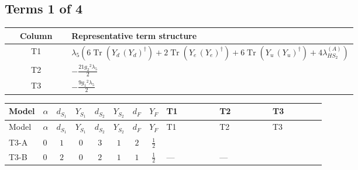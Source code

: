 \documentclass[8pt]{article}
\begin{document}
\begin{landscape}
\subsection*{Terms 1 of 4}
\begin{center}
\begin{tabular}{@{}c >{\raggedright\arraybackslash}p{0.82\linewidth}@{}}
\toprule
Column & Representative term structure \\
\midrule
T1 & \(\displaystyle {\lambda_5} (6 \operatorname{Tr}\!\left({Y_d}\,\left({Y_d}\right)^{\dagger}\right)+2 \operatorname{Tr}\!\left({Y_e}\,\left({Y_e}\right)^{\dagger}\right)+6 \operatorname{Tr}\!\left({Y_u}\,\left({Y_u}\right)^{\dagger}\right)+4 {\lambda_{HS_2}^{(A)}})\) \\
\midrule
T2 & \(\displaystyle -\frac{21 {g_2}^2 {\lambda_5}}{2}\) \\
\midrule
T3 & \(\displaystyle -\frac{9 {g_1}^2 {\lambda_5}}{2}\) \\
\midrule
\bottomrule
\end{tabular}
\end{center}
\smallskip
\tiny
\begin{longtable}{@{}llcccccc >{\raggedright\arraybackslash}p{0.21\linewidth} >{\raggedright\arraybackslash}p{0.21\linewidth} >{\raggedright\arraybackslash}p{0.21\linewidth}@{}}
\toprule
Model & $\alpha$ & $d_{S_1}$ & $Y_{S_1}$ & $d_{S_2}$ & $Y_{S_2}$ & $d_F$ & $Y_F$ & T1 & T2 & T3 \\
\midrule
\endfirsthead
\toprule
Model & $\alpha$ & $d_{S_1}$ & $Y_{S_1}$ & $d_{S_2}$ & $Y_{S_2}$ & $d_F$ & $Y_F$ & T1 & T2 & T3 \\
\midrule
\endhead
T3-A & $0$ & $1$ & $0$ & $3$ & $1$ & $2$ & $\frac{1}{2}$ & \scriptsize\adjustbox{max width=\linewidth}{$\begin{gathered} {\lambda_5} (6 \operatorname{Tr}\!\left({Y_d}\,\left({Y_d}\right)^{\dagger}\right)+2 \operatorname{Tr}\!\left({Y_e}\,\left({Y_e}\right)^{\dagger}\right)+6 \operatorname{Tr}\!\left({Y_u}\,\left({Y_u}\right)^{\dagger}\right)+4 {\lambda_{HS_2}^{(A)}})\end{gathered}$} & \scriptsize\adjustbox{max width=\linewidth}{$\begin{gathered} -\frac{21 {g_2}^2 {\lambda_5}}{2}\end{gathered}$} & \scriptsize\adjustbox{max width=\linewidth}{$\begin{gathered} -\frac{9 {g_1}^2 {\lambda_5}}{2}\end{gathered}$} \\
\midrule
T3-B & $0$ & $2$ & $0$ & $2$ & $1$ & $1$ & $\frac{1}{2}$ & --- & --- & \scriptsize\adjustbox{max width=\linewidth}{$\begin{gathered} -\frac{9 {g_1}^2 {\lambda_5}}{2}\end{gathered}$} \\

\end{longtable}
\end{landscape}
\end{document}
